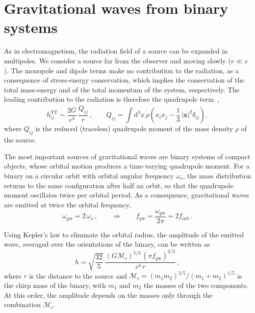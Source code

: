 \section{Gravitational waves from binary systems} \label{sec:GW_binarie}

As in electromagnetism, the radiation field of a source can be expanded in
multipoles. We consider a source far from the observer and moving slowly
($v \ll c$). The monopole and dipole terms make no contribution to the radiation, as a
consequence of stress-energy conservation, which implies the conservation of
the total mass-energy and of the total momentum of the system, respectively. The leading contribution to the
radiation is therefore the quadrupole term~\cite{Maggiore2008},
\begin{equation}
    h_{ij}^{\mathrm{TT}} \sim \frac{2G}{c^4}\,\frac{\ddot{Q}_{ij}}{r}\, ,
    \qquad
    Q_{ij} = \int \mathrm{d}^3x\, \rho \left( x_i x_j - \frac{1}{3}\, |\mathbf{x}|^2 \delta_{ij} \right) ,
    \label{eq:quadrupolo}
\end{equation}
where $Q_{ij}$ is the reduced (traceless) quadrupole moment of the mass density
$\rho$ of the source.

The most important sources of gravitational waves are binary systems of compact
objects, whose orbital motion produces a time-varying quadrupole moment.
For a binary on a circular orbit with orbital angular frequency
$\omega_s$, the mass distribution returns to the same configuration after half
an orbit, so that the quadrupole moment oscillates twice per orbital period.
As a consequence, gravitational waves are emitted at twice the orbital
frequency,
\begin{equation}
    \omega_{\mathrm{gw}} = 2\,\omega_s\, , \qquad \Rightarrow \qquad
    f_{\mathrm{gw}} = \frac{\omega_{\mathrm{gw}}}{2\pi} = 2 f_{\mathrm{orb}}\, .
    \label{eq:fgw}
\end{equation}

Using Kepler's law to eliminate the orbital radius, the amplitude of the
emitted wave, averaged over the orientations of the binary, can be written as~\cite{Maggiore2008,Taylor2021}
\begin{equation}
    h = \sqrt{\frac{32}{5}}\;
    \frac{(G\mathcal{M}_c)^{5/3}\,(\pi f_{\mathrm{gw}})^{2/3}}{c^4\, r}\, ,
    \label{eq:ampiezza_binaria}
\end{equation}
where $r$ is the distance to the source and
$\mathcal{M}_c = (m_1 m_2)^{3/5}/(m_1 + m_2)^{1/5}$ is the chirp mass of the binary, with $m_1$ and $m_2$ the masses of the two
components. At this order, the amplitude depends on the masses only through
the combination $\mathcal{M}_c$.

